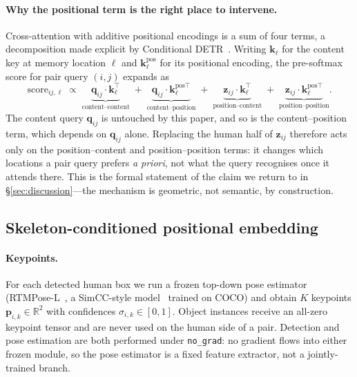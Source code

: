\documentclass[12pt,a4paper]{article}
\newcommand{\bp}{\mathbf{p}}
\newcommand{\bq}{\mathbf{q}}
\newcommand{\bz}{\mathbf{z}}
\newcommand{\R}{\mathbb{R}}
\begin{document}
\paragraph{Why the positional term is the right place to intervene.}
Cross-attention with additive positional encodings is a sum of four terms, a
decomposition made explicit by Conditional DETR~\cite{meng2021conditional}.
Writing $\mathbf{k}_\ell$ for the content key at memory location $\ell$ and
$\mathbf{k}^{\text{pos}}_\ell$ for its positional encoding, the pre-softmax
score for pair query $(i,j)$ expands as
\begin{equation}
\mathrm{score}_{ij,\ell} \;\propto\;
\underbrace{\bq_{ij}\!\cdot\!\mathbf{k}_\ell^{\top}}_{\text{content--content}}
\;+\;
\underbrace{\bq_{ij}\!\cdot\!\mathbf{k}^{\text{pos}\top}_\ell}_{\text{content--position}}
\;+\;
\underbrace{\bz_{ij}\!\cdot\!\mathbf{k}_\ell^{\top}}_{\text{position--content}}
\;+\;
\underbrace{\bz_{ij}\!\cdot\!\mathbf{k}^{\text{pos}\top}_\ell}_{\text{position--position}}.
\label{eq:decomp}
\end{equation}
The content query $\bq_{ij}$ is untouched by this paper, and so is the
content--position term, which depends on $\bq_{ij}$ alone. Replacing the human
half of $\bz_{ij}$ therefore acts only on the position--content and
position--position terms: it changes which locations a pair query prefers
\emph{a priori}, not what the query recognises once it attends there. This is
the formal statement of the claim we return to in
\S\ref{sec:discussion}---the mechanism is geometric, not semantic, by
construction.

\subsection{Skeleton-conditioned positional embedding}
\label{sec:skeleton}

\paragraph{Keypoints.} For each detected human box we run a frozen top-down
pose estimator (RTMPose-L~\cite{jiang2023rtmpose}, a SimCC-style
model~\cite{li2022simcc} trained on COCO) and obtain $K$ keypoints
$\bp_{i,k} \in \R^2$ with confidences $\sigma_{i,k} \in [0,1]$. Object
instances receive an all-zero keypoint tensor and are never used on the human
side of a pair. Detection and pose estimation are both performed under
\texttt{no\_grad}: no gradient flows into either frozen module, so the pose
estimator is a fixed feature extractor, not a jointly-trained branch.
\end{document}
